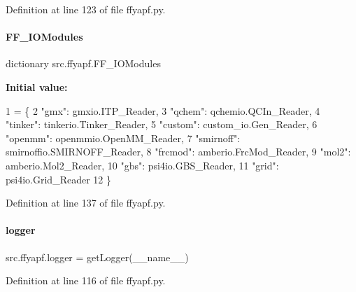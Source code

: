 Definition at line 123 of file ffyapf.\+py.

\mbox{\label{namespacesrc_1_1ffyapf_a0131e28e9656a939158dde482700058b}} 
\paragraph{\texorpdfstring{F\+F\+\_\+\+I\+O\+Modules}{FF\_IOModules}}
{\footnotesize\ttfamily dictionary src.\+ffyapf.\+F\+F\+\_\+\+I\+O\+Modules}

{\bfseries Initial value\+:}
\begin{DoxyCode}
1 =  \{
2     \textcolor{stringliteral}{"gmx"}: gmxio.ITP\_Reader,
3     \textcolor{stringliteral}{"qchem"}: qchemio.QCIn\_Reader,
4     \textcolor{stringliteral}{"tinker"}: tinkerio.Tinker\_Reader,
5     \textcolor{stringliteral}{"custom"}: custom\_io.Gen\_Reader,
6     \textcolor{stringliteral}{"openmm"}: openmmio.OpenMM\_Reader,
7     \textcolor{stringliteral}{"smirnoff"}: smirnoffio.SMIRNOFF\_Reader,
8     \textcolor{stringliteral}{"frcmod"}: amberio.FrcMod\_Reader,
9     \textcolor{stringliteral}{"mol2"}: amberio.Mol2\_Reader,
10     \textcolor{stringliteral}{"gbs"}: psi4io.GBS\_Reader,
11     \textcolor{stringliteral}{"grid"}: psi4io.Grid\_Reader
12 \}
\end{DoxyCode}


Definition at line 137 of file ffyapf.\+py.

\mbox{\label{namespacesrc_1_1ffyapf_a36a17b3ff1bf917d6e0100ea1217d5aa}} 
\paragraph{\texorpdfstring{logger}{logger}}
{\footnotesize\ttfamily src.\+ffyapf.\+logger = get\+Logger(\+\_\+\+\_\+name\+\_\+\+\_\+)}



Definition at line 116 of file ffyapf.\+py.

